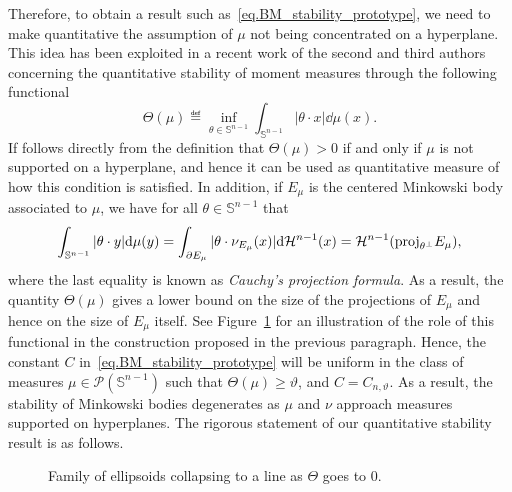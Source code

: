 \documentclass[a4paper, 10pt, twoside]{amsart}
\numberwithin{equation}{section}
\theoremstyle{plain}
\theoremstyle{definition}
\begin{document}
Therefore, to obtain a result such as~\eqref{eq.BM_stability_prototype}, we need to make quantitative the assumption of $\mu$ not being concentrated on a hyperplane. This idea has been exploited in a recent work of the second and third authors~\cite{machado2025quantitative} concerning the quantitative stability of moment measures through the following functional 
\begin{equation}\label{eq.Theta_functional}
    \Theta(\mu) 
    \eqdef 
    \inf_{\theta \in \mathbb{S}^{n-1}} 
    \int_{\mathbb{S}^{n-1}} |\theta \cdot x| \dd \mu(x).
\end{equation}
If follows directly from the definition that $\Theta(\mu) > 0$ if and only if $\mu$ is not supported on a hyperplane, and hence it can be used as quantitative measure of how this condition is satisfied. In addition, if $E_\mu$ is the centered Minkowski body associated to $\mu$, we have for all $\theta \in \mathbb{S}^{n-1}$ that
\begin{equation}
    \int_{\mathbb{S}^{n-1}} |\theta \cdot y| {\rm d} \mu(y) 
    = 
    \int_{\partial E_\mu} |\theta \cdot \nu_{E_\mu}(x)| {\rm d} \mathcal{H}^{n-1}(x)
    = 
    \mathcal{H}^{n-1}({\mathop{\rm proj}}_{\theta^\perp} E_\mu),
\end{equation}
where the last equality is known as \textit{Cauchy's projection formula}. As a result, the quantity $\Theta(\mu)$ gives a lower bound on the size of the projections of $E_\mu$ and hence on the size of $E_\mu$ itself. See Figure~\ref{fig.degenerate_minko_bodies} for an illustration of the role of this functional in the construction proposed in the previous paragraph. Hence, the constant $C$ in~\eqref{eq.BM_stability_prototype} will be uniform in the class of measures $\mu \in \mathscr{P}(\mathbb{S}^{n-1})$ such that $\Theta(\mu) \geq \vartheta$, and $C = C_{n,\vartheta}$.  As a result, the stability of Minkowski bodies degenerates as $\mu$ and $\nu$ approach measures supported on hyperplanes. The rigorous statement of our quantitative stability result is as follows. 

\begin{figure}[ht]\label{fig.degenerate_minko_bodies}
    \centering
    
    \caption{Family of ellipsoids collapsing to a line as $\Theta$ goes to $0$.}
\end{figure}
\end{document}
